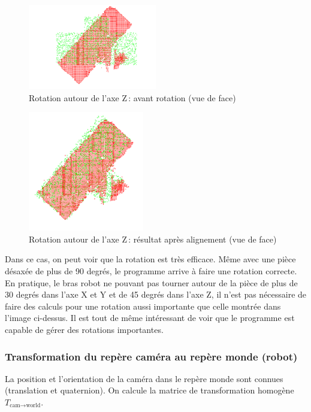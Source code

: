 \begin{figure}[H]
    \centering
    \includegraphics[width=0.50\textwidth]{assets/figures/rot_z_avt.png}
    \caption{Rotation autour de l’axe Z : avant rotation (vue de face)}
    \label{fig:rot_z_avt}
\end{figure}
\begin{figure}[H]
    \centering
    \includegraphics[width=0.45\textwidth]{assets/figures/rot_z_aprs.png}
    \caption{Rotation autour de l’axe Z : résultat après alignement (vue de face)}
    \label{fig:rot_z_aprs}
\end{figure}
Dans ce cas, on peut voir que la rotation est très efficace. Même avec une pièce désaxée de plus de 90 degrés, le programme arrive à faire une rotation correcte. En pratique, le bras robot ne pouvant pas tourner autour de la pièce de plus de 30 degrés dans l'axe X et Y et de 45 degrés dans l'axe Z, il n'est pas nécessaire de faire des calculs pour une rotation aussi importante que celle montrée dans l'image ci-dessus. Il est tout de même intéressant de voir que le programme est capable de gérer des rotations importantes.

\subsubsection{Transformation du repère caméra au repère monde (robot)}

La position et l’orientation de la caméra dans le repère monde sont connues (translation et quaternion). On calcule la matrice de transformation homogène $T_{\text{cam} \to \text{world}}$.

